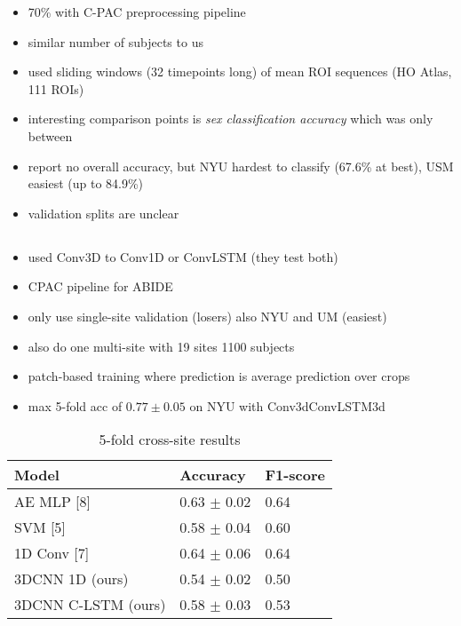 \documentclass[10pt]{article}
\begin{document}
\begin{itemize}
  \item 70\% with C-PAC preprocessing pipeline
  \item similar number of subjects to us
  \item used sliding windows (32 timepoints long) of mean ROI sequences (HO Atlas, 111 ROIs)
  \item interesting comparison points is \emph{sex classification accuracy} which was only between
  \item report no overall accuracy, but NYU hardest to classify (67.6\% at best), USM easiest (up to
  84.9\%)
  \item validation splits are unclear
\end{itemize}

\subsection{\citet{el-gazzarHybrid3DCNN3DCLSTM2019}}

\begin{itemize}
  \item used Conv3D to Conv1D or ConvLSTM (they test both)
  \item CPAC pipeline for ABIDE
  \item only use single-site validation (losers) also NYU and UM (easiest)
  \item also do one multi-site with 19 sites 1100 subjects
  \item patch-based training where prediction is average prediction over crops
  \item max 5-fold acc of \(0.77 \pm 0.05\) on NYU with Conv3dConvLSTM3d
\end{itemize}

\begin{table}
\caption{\citet{el-gazzarHybrid3DCNN3DCLSTM2019} 5-fold cross-site results}
\centering
  \begin{tabular}{lll}
    \toprule
    Model     & Accuracy     & F1-score \\
    \midrule
    AE MLP        [8]   &  0.63 \(\pm\) 0.02  & 0.64 \\
    SVM           [5]   &  0.58 \(\pm\) 0.04  & 0.60 \\
    1D Conv       [7]   &  0.64 \(\pm\) 0.06  & 0.64 \\
    3DCNN 1D     (ours) &  0.54 \(\pm\) 0.02  & 0.50 \\
    3DCNN C-LSTM (ours) &  0.58 \(\pm\) 0.03  & 0.53 \\

    \bottomrule
  \end{tabular}
  \label{tab:table}
\end{table}
\end{document}
